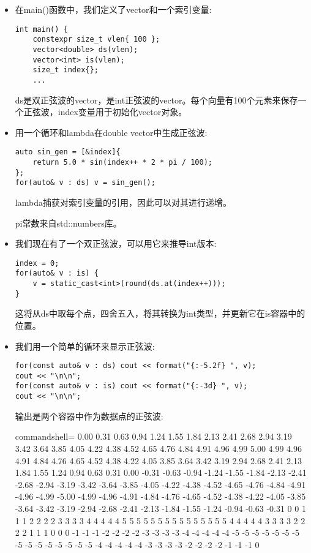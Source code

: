 \begin{itemize}
\item 
在main()函数中，我们定义了vector和一个索引变量:

\begin{lstlisting}[style=styleCXX]
int main() {
	constexpr size_t vlen{ 100 };
	vector<double> ds(vlen);
	vector<int> is(vlen);
	size_t index{};
	...
\end{lstlisting}

ds是双正弦波的vector，是int正弦波的vector。每个向量有100个元素来保存一个正弦波，index变量用于初始化vector对象。

\item 
用一个循环和lambda在double vector中生成正弦波:

\begin{lstlisting}[style=styleCXX]
auto sin_gen = [&index]{
	return 5.0 * sin(index++ * 2 * pi / 100);
};
for(auto& v : ds) v = sin_gen();
\end{lstlisting}

lambda捕获对索引变量的引用，因此可以对其进行递增。

pi常数来自std::numbers库。

\item 
我们现在有了一个双正弦波，可以用它来推导int版本:

\begin{lstlisting}[style=styleCXX]
index = 0;
for(auto& v : is) {
	v = static_cast<int>(round(ds.at(index++)));
}
\end{lstlisting}

这将从ds中取每个点，四舍五入，将其转换为int类型，并更新它在is容器中的位置。

\item 
我们用一个简单的循环来显示正弦波:

\begin{lstlisting}[style=styleCXX]
for(const auto& v : ds) cout << format("{:-5.2f} ", v);
cout << "\n\n";
for(const auto& v : is) cout << format("{:-3d} ", v);
cout << "\n\n";
\end{lstlisting}

输出是两个容器中作为数据点的正弦波:

\begin{tcblisting}{commandshell={}}
0.00 0.31 0.63 0.94 1.24 1.55 1.84 2.13 2.41
2.68 2.94 3.19 3.42 3.64 3.85 4.05 4.22 4.38
4.52 4.65 4.76 4.84 4.91 4.96 4.99 5.00 4.99
4.96 4.91 4.84 4.76 4.65 4.52 4.38 4.22 4.05
3.85 3.64 3.42 3.19 2.94 2.68 2.41 2.13 1.84
1.55 1.24 0.94 0.63 0.31 0.00 -0.31 -0.63 -0.94
-1.24 -1.55 -1.84 -2.13 -2.41 -2.68 -2.94 -3.19 -3.42
-3.64 -3.85 -4.05 -4.22 -4.38 -4.52 -4.65 -4.76 -4.84
-4.91 -4.96 -4.99 -5.00 -4.99 -4.96 -4.91 -4.84 -4.76
-4.65 -4.52 -4.38 -4.22 -4.05 -3.85 -3.64 -3.42 -3.19
-2.94 -2.68 -2.41 -2.13 -1.84 -1.55 -1.24 -0.94 -0.63
-0.31
0 0 1 1 1 2 2 2 2 3 3 3 3 4 4
4 4 4 5 5 5 5 5 5 5 5 5 5 5 5
5 5 5 4 4 4 4 4 3 3 3 3 2 2 2
2 1 1 1 0 0 0 -1 -1 -1 -2 -2 -2 -2 -3
-3 -3 -3 -4 -4 -4 -4 -4 -5 -5 -5 -5 -5 -5
-5 -5 -5 -5 -5 -5 -5 -5 -5 -4 -4 -4 -4 -4
-3 -3 -3 -3 -2 -2 -2 -2 -1 -1 -1 0
\end{tcblisting}


\end{itemize}
